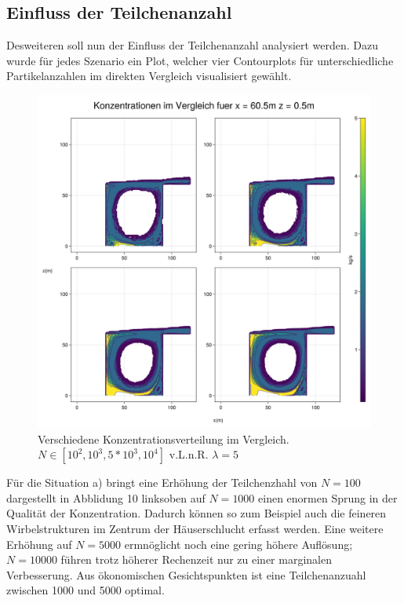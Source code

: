 \documentclass[ngerman]{scrartcl}
\begin{document}
\subsection{Einfluss der Teilchenanzahl}
Desweiteren soll nun der Einfluss der Teilchenanzahl analysiert werden. Dazu wurde für jedes Szenario ein Plot, welcher vier Contourplots für unterschiedliche Partikelanzahlen im direkten Vergleich visualisiert gewählt.
\begin{figure}[H]
	\centering
	\includegraphics[scale=0.25]{Bilder/3_vergleich_x = 60.5.png}
	\caption{ Verschiedene Konzentrationsverteilung im Vergleich. $N \in[10^2,10^3,5 *10^3,10^4]$ v.L.n.R.  $\lambda =5$}
	\label{fig:my_label}
\end{figure}
Für die Situation a) bringt eine Erhöhung der Teilchenzhahl von $ N=100$ dargestellt in Abblidung 10 linksoben auf  $ N=1000$ einen enormen Sprung in der Qualität der Konzentration. Dadurch können so zum Beispiel auch die feineren Wirbelstrukturen im Zentrum der Häuserschlucht erfasst werden. Eine weitere Erhöhung auf $N=5000$ ermnöglicht  noch eine gering höhere Auflösung; $N=10000$ führen trotz höherer Rechenzeit nur zu einer marginalen Verbesserung. Aus ökonomischen Gesichtspunkten ist eine Teilchenanzuahl zwischen 1000 und 5000 optimal.
\end{document}
